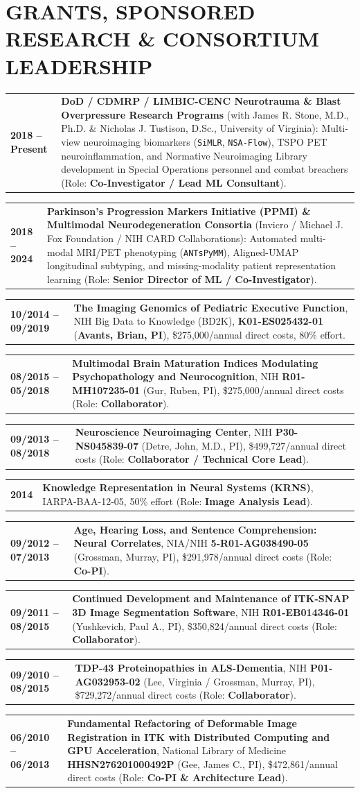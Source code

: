 \documentclass[10pt,letterpaper]{article}
\makeatletter
\newcommand{\cvline}[2]{%
  \noindent\begin{tabularx}{\textwidth}{@{} >{\raggedright\arraybackslash\bfseries\footnotesize\color{accent}}p{1.15in} >{\footnotesize\arraybackslash}X @{}}
    #1 & #2
  \end{tabularx}\par\vspace{2pt}%
}
\makeatother
\begin{document}
\section{GRANTS, SPONSORED RESEARCH \& CONSORTIUM LEADERSHIP}
\cvline{2018 -- Present}{\textbf{DoD / CDMRP / LIMBIC-CENC Neurotrauma \& Blast Overpressure Research Programs} (with James R. Stone, M.D., Ph.D. \& Nicholas J. Tustison, D.Sc., University of Virginia): Multi-view neuroimaging biomarkers (\texttt{SiMLR}, \texttt{NSA-Flow}), TSPO PET neuroinflammation, and Normative Neuroimaging Library development in Special Operations personnel and combat breachers (Role: \textbf{Co-Investigator / Lead ML Consultant}).}
\cvline{2018 -- 2024}{\textbf{Parkinson's Progression Markers Initiative (PPMI) \& Multimodal Neurodegeneration Consortia} (Invicro / Michael J. Fox Foundation / NIH CARD Collaborations): Automated multi-modal MRI/PET phenotyping (\texttt{ANTsPyMM}), Aligned-UMAP longitudinal subtyping, and missing-modality patient representation learning (Role: \textbf{Senior Director of ML / Co-Investigator}).}
\cvline{10/2014 -- 09/2019}{\textbf{The Imaging Genomics of Pediatric Executive Function}, NIH Big Data to Knowledge (BD2K), \textbf{K01-ES025432-01} (\textbf{Avants, Brian, PI}), \$275,000/annual direct costs, 80\% effort.}
\cvline{08/2015 -- 05/2018}{\textbf{Multimodal Brain Maturation Indices Modulating Psychopathology and Neurocognition}, NIH \textbf{R01-MH107235-01} (Gur, Ruben, PI), \$275,000/annual direct costs (Role: \textbf{Collaborator}).}
\cvline{09/2013 -- 08/2018}{\textbf{Neuroscience Neuroimaging Center}, NIH \textbf{P30-NS045839-07} (Detre, John, M.D., PI), \$499,727/annual direct costs (Role: \textbf{Collaborator / Technical Core Lead}).}
\cvline{2014}{\textbf{Knowledge Representation in Neural Systems (KRNS)}, IARPA-BAA-12-05, 50\% effort (Role: \textbf{Image Analysis Lead}).}
\cvline{09/2012 -- 07/2013}{\textbf{Age, Hearing Loss, and Sentence Comprehension: Neural Correlates}, NIA/NIH \textbf{5-R01-AG038490-05} (Grossman, Murray, PI), \$291,978/annual direct costs (Role: \textbf{Co-PI}).}
\cvline{09/2011 -- 08/2015}{\textbf{Continued Development and Maintenance of ITK-SNAP 3D Image Segmentation Software}, NIH \textbf{R01-EB014346-01} (Yushkevich, Paul A., PI), \$350,824/annual direct costs (Role: \textbf{Collaborator}).}
\cvline{09/2010 -- 08/2015}{\textbf{TDP-43 Proteinopathies in ALS-Dementia}, NIH \textbf{P01-AG032953-02} (Lee, Virginia / Grossman, Murray, PI), \$729,272/annual direct costs (Role: \textbf{Collaborator}).}
\cvline{06/2010 -- 06/2013}{\textbf{Fundamental Refactoring of Deformable Image Registration in ITK with Distributed Computing and GPU Acceleration}, National Library of Medicine \textbf{HHSN276201000492P} (Gee, James C., PI), \$472,861/annual direct costs (Role: \textbf{Co-PI \& Architecture Lead}).}
\end{document}
